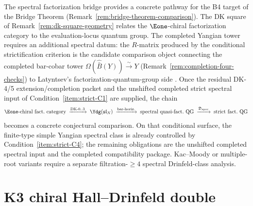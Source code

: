 \begin{remark}
\label{rem:spectral-bridge-dk-square}
The spectral factorization bridge provides a concrete pathway
for the B4 target of the Bridge Theorem
(Remark~\ref{rem:bridge-theorem-comparison}). The DK square of
Remark~\ref{rem:dk-square-geometry} relates the $\Eone$-chiral
factorization category to the evaluation-locus quantum group.
The completed Yangian tower requires an additional spectral datum: the
$R$-matrix produced by the conditional strictification criterion is the
candidate comparison object connecting the completed bar-cobar tower
$\Omega(\widehat{\bar B}(Y)) \xrightarrow{\sim} Y$
(Remark~\ref{rem:completion-four-checks})
to Latyntsev's factorization-quantum-group side
\cite{Latyntsev23}. Once the residual DK-4/5 extension/completion
packet and the unshifted completed strict spectral input of
Condition~\ref{item:strict-C1} are supplied, the chain
\[
 \text{$\Eone$-chiral fact.\ category}
 \;\xrightarrow{\text{DK-0..3}}\;
 \Ydg(\mathfrak{sl}_N)
 \;\xrightarrow{\text{bar-horiz.}}\;
 \text{spectral quasi-fact.\ QG}
 \;\xrightarrow{\mathfrak{D}_{\mathrm{spec}}}\;
 \text{strict fact.\ QG}
\]
becomes a concrete conjectural comparison. On that conditional surface, the
finite-type simple Yangian spectral class is already controlled by
Condition~\ref{item:strict-C4}; the remaining obligations are the
unshifted completed spectral input and the completed compatibility
package. Kac--Moody or multiple-root variants require a separate
filtration-$\ge4$ spectral Drinfeld-class analysis.
\end{remark}

\section{K3 chiral Hall--Drinfeld double}
\label{sec:ydk-supplement}

